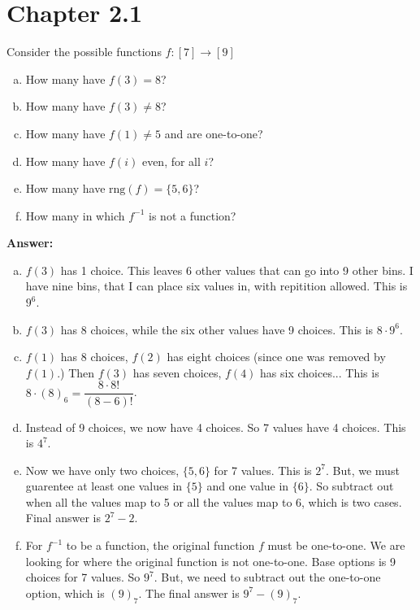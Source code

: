 \documentclass{article}
\begin{document}
\section{Chapter 2.1}
\setcounter{problem}{3}
\begin{problem} %
Consider the possible functions $f: [7] \rightarrow [9]$
\begin{enumerate}[(a)]
    \item How many have $f(3) = 8$? 
    \item How many have $f(3) \neq 8$?
    \item How many have $f(1) \neq 5$ and are one-to-one?
    \item How many have $f(i)$ even, for all $i$?
    \item How many have $\text{rng}(f) = \{5, 6 \}$?
    \item How many in which $f^{-1}$ is not a function?
\end{enumerate}
\end{problem}

\textbf{Answer:}
\begin{enumerate}[(a)]
    \item $f(3)$ has 1 choice. This leaves 6 other values that can go into 9 other bins. I have nine bins, that I can place six values in, with repitition allowed. This is $9^6$.
    \item $f(3)$ has 8 choices, while the six other values have 9 choices. This is $8 \cdot 9^6$.
    \item $f(1)$ has 8 choices, $f(2)$ has eight choices (since one was removed by $f(1)$.) Then $f(3)$ has seven choices, $f(4)$ has six choices... This is $8 \cdot (8)_6 = \dfrac{8 \cdot 8!}{(8-6)!}$.
    \item Instead of 9 choices, we now have 4 choices. So 7 values have 4 choices. This is $4^7$.
    \item Now we have only two choices, $\{5, 6\}$ for 7 values. This is $2^7$. But, we must guarentee at least one values in $\{5\}$ and one value in $\{6\}$. So subtract out when all the values map to 5 or all the values map to 6, which is two cases. Final answer is $2^7 - 2$.
    \item For $f^{-1}$ to be a function, the original function $f$ must be one-to-one. We are looking for where the original function is not one-to-one. Base options is 9 choices for 7 values. So $9^7$. But, we need to subtract out the one-to-one option, which is $(9)_7$. The final answer is $9^7 - (9)_7$.
\end{enumerate}
\end{document}
